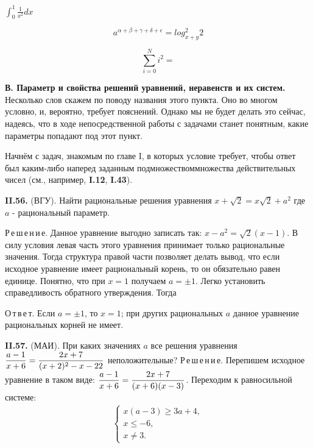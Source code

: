 \documentclass{article}
\begin{document}
$\int_{0}^{1} {\frac{1}{x^2} dx}$

\begin{equation}
 a^{\alpha + \beta + \gamma + \delta + \epsilon} = log_{x + y}^2 2
\end{equation}

\begin{equation}
\sum_{i=0}^{N} {i^2} = 
\end{equation}
 
\textbf{В. Параметр и свойства решений уравнений, неравенств и их систем.} Несколько слов скажем по поводу названия этого пункта. Оно во многом условно, и, вероятно, требует пояснений. Однако мы не будет делать это сейчас, надеясь, что в ходе непосредственной работы с задачами станет понятным, какие параметры попадают под этот пункт.
 
Начнём с задач, знакомым по главе I, в которых условие требует, чтобы ответ был каким-либо наперед заданным подмножествоммножества действительных чисел (см., например, \textbf{I.12}, \textbf{I.43}).
 
\textbf{II.56.} (ВГУ). Найти рациональные решения уравнения
$x + \sqrt{2} = x\sqrt{2} + a^2 $
где $a$ - рациональный параметр.
 
Р\,е\,ш\,е\,н\,и\,е.  Данное уравнение выгодно записать так:
$x - a^2  = \sqrt{2}(x - 1) $.
В силу условия левая часть этого уравнения принимает только рациональные значения. Тогда структура правой части позволяет делать вывод, что если исходное уравнение имеет рациональный корень, то он обязательно равен единице. Понятно, что при $x = 1$ получаем $a = \pm 1$. Легко установить справедливость обратного утверждения. Тогда
 
О\,т\,в\,е\,т. Если $a = \pm 1$, то $x = 1$; при других рациональных $a$ данное уравнение рациональных корней не имеет.
 
\textbf{II.57.} (МАИ). При каких значениях $a$ все решения уравнения $\displaystyle {{a - 1}\over{x + 6}} = {{2x + 7}\over{(x + 2)^2 - x - 22}}$ неположительные?
Р\,е\,ш\,е\,н\,и\,е.  Перепишем исходное уравнение в таком виде:
 $\displaystyle {{a - 1}\over{x + 6}} = {{2x + 7}\over{(x + 6)(x - 3)}}$.
 Переходим к равносильной системе:
 \begin{eqnarray}
 \begin{cases}
   x(a - 3) \geq 3a + 4, 
   \\
   x \leq -6,
   \\
   x \ne 3.  
   \end{cases}
 \end{eqnarray}
\end{document}
